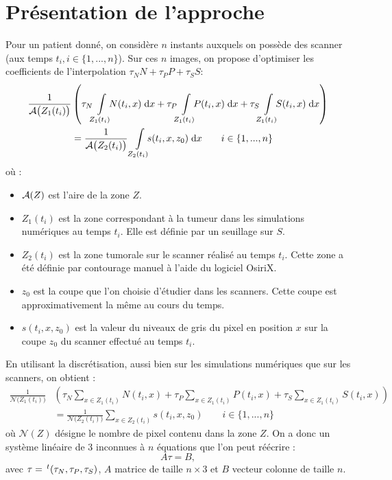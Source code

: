 \documentclass[main.tex]{subfiles}
\begin{document}
\section{Présentation de l'approche}
Pour un patient donné, on considère $n$ instants auxquels on possède des scanner (aux temps $t_i, i\in \{ 1,...,n \}$). Sur ces $n$ images, on propose d'optimiser les coefficients de l'interpolation $\tau_N N + \tau_P P + \tau_S S$:
\begin{equation}
\begin{aligned}
\frac{1}{\aire\big(Z_1(t_i)\big)}&\left( \tau_N\intperso{Z_1(t_i)}N(t_i,x) \dx + \tau_P\intperso{Z_1(t_i)}P(t_i,x) \dx + \tau_S\intperso{Z_1(t_i)} S(t_i,x) \dx \right) \\
&= \frac{1}{\aire\big(Z_2(t_i)\big)} \ \intperso{Z_2(t_i)} s(t_i,x,z_0) \dx \qquad i \in \{1,...,n\}
\end{aligned}
\end{equation}
où : \begin{itemize}
\item $\mathcal{A}(Z)$ est l'aire de la zone $Z$.
\item $Z_1(t_i)$ est la zone correspondant à la tumeur dans les simulations numériques au temps $t_i$. Elle est définie par un seuillage sur $S$.
\item $Z_2(t_i)$ est la zone tumorale sur le scanner réalisé au temps $t_i$. Cette zone a été définie par contourage manuel à l'aide du logiciel OsiriX.
\item $z_0$ est la coupe que l'on choisie d'étudier dans les scanners. Cette coupe est approximativement la même au cours du temps.
\item $s(t_i,x,z_0)$ est la valeur du niveaux de gris du pixel en position $x$ sur la coupe $z_0$ du scanner effectué au temps $t_i$.
\end{itemize}
En utilisant la discrétisation, aussi bien sur les simulations numériques que sur les scanners, on obtient :
\begin{equation}
\begin{aligned}
\frac{1}{\mathcal{N}\big(Z_1(t_i)\big)}&\left( \tau_N\!\!\sum_{x\in Z_1(t_i)}\!\!N(t_i,x) + \tau_P\!\!\sum_{x\in Z_1(t_i)}\!\!P(t_i,x) + \tau_S\!\!\sum_{x\in Z_1(t_i)}\!\!S(t_i,x) \right) \\
&= \frac{1}{\mathcal{N}\big(Z_2(t_i)\big)} \sum_{x\in Z_2(t_i)}\!\! s(t_i,x,z_0) \qquad i \in \{1,...,n\}
\end{aligned}
\end{equation}
où $\mathcal{N}(Z)$ désigne le nombre de pixel contenu dans la zone $Z$. On a donc un système linéaire de 3 inconnues à $n$ équations que l'on peut réécrire :
\begin{equation}
A\tau=B,
\end{equation}
avec $\tau= \,^t(\tau_N,\tau_P,\tau_S)$, $A$ matrice de taille $n\times 3$ et $B$ vecteur colonne de taille $n$.
\end{document}
